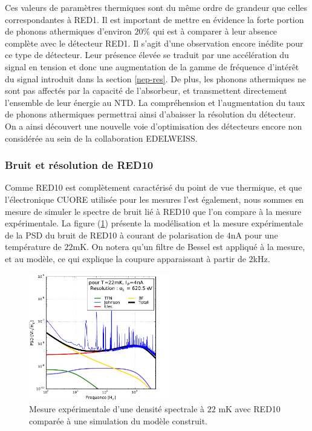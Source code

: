 Ces valeurs de paramètres thermiques sont du même ordre de grandeur que celles correspondantes à RED1. Il est important de mettre en évidence la forte portion de phonons athermiques d'environ $20\%$ qui est à comparer à leur absence complète avec le détecteur RED1. Il s'agit d'une observation encore inédite pour ce type de détecteur. Leur présence élevée se traduit par une accélération du signal en tension et donc une augmentation de la gamme de fréquence d'intérêt du signal introduit dans la section \ref{nep-res}. De plus, les phonons athermiques ne sont pas affectés par la capacité de l'absorbeur, et transmettent directement l'ensemble de leur énergie au NTD. La compréhension et l'augmentation du taux de phonons athermiques permettrai ainsi d'abaisser la résolution du détecteur. On a ainsi découvert une nouvelle voie d'optimisation des détecteurs encore non considérée au sein de la collaboration EDELWEISS.

\subsubsection{Bruit et résolution de RED10}

Comme RED10 est complètement caractérisé du point de vue thermique, et que l'électronique CUORE utilisée pour les mesures l'est également, nous sommes en mesure de simuler le spectre de bruit lié à RED10 que l'on compare à la mesure expérimentale. La figure (\ref{noise-red10}) présente la modélisation et la mesure expérimentale de la PSD du bruit de RED10 à courant de polarisation de $4$nA pour une température de $22$mK. On notera qu'un filtre de Bessel est appliqué à la mesure, et au modèle, ce qui explique la coupure apparaissant à partir de $2$kHz.

\begin{figure}[!ht]
\begin{center}
\includegraphics[width=0.55\textwidth]{Images/modexp.pdf}
\end{center}
\caption{Mesure expérimentale d'une densité spectrale à $22$ mK avec RED10 comparée à une simulation du modèle construit.}
\label{noise-red10}
\end{figure}

